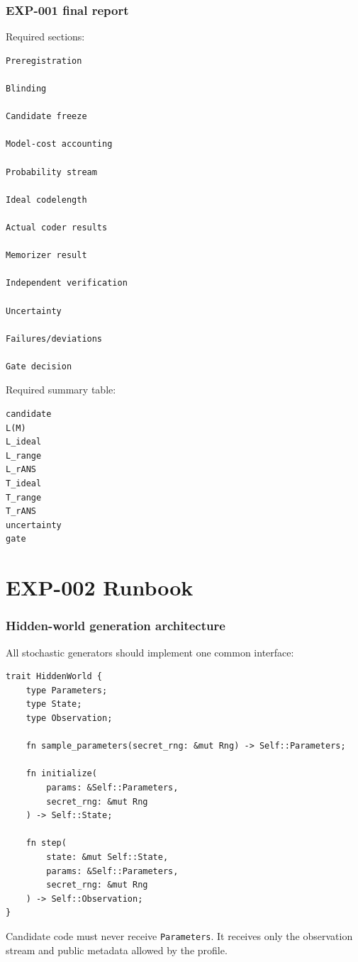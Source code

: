 \documentclass[11pt]{article}
\begin{document}
\section{EXP-001 final report}

Required sections:
\begin{verbatim}
Preregistration

Blinding

Candidate freeze

Model-cost accounting

Probability stream

Ideal codelength

Actual coder results

Memorizer result

Independent verification

Uncertainty

Failures/deviations

Gate decision
\end{verbatim}
Required summary table:
\begin{verbatim}
candidate
L(M)
L_ideal
L_range
L_rANS
T_ideal
T_range
T_rANS
uncertainty
gate
\end{verbatim}

\part{EXP-002 Runbook}

\section{Hidden-world generation architecture}

All stochastic generators should implement one common interface:
\begin{verbatim}
trait HiddenWorld {
    type Parameters;
    type State;
    type Observation;

    fn sample_parameters(secret_rng: &mut Rng) -> Self::Parameters;

    fn initialize(
        params: &Self::Parameters,
        secret_rng: &mut Rng
    ) -> Self::State;

    fn step(
        state: &mut Self::State,
        params: &Self::Parameters,
        secret_rng: &mut Rng
    ) -> Self::Observation;
}
\end{verbatim}
Candidate code must never receive \texttt{Parameters}. It receives only the observation stream and public metadata allowed by the profile.
\end{document}
